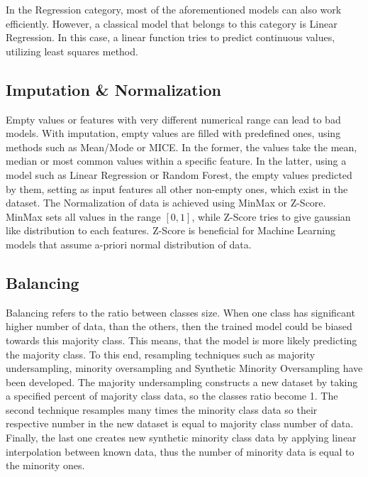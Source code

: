 \documentclass[journal,article,submit,pdftex,moreauthors]{Definitions/mdpi}
\begin{document}
In the Regression category, most of the aforementioned models can also work efficiently. However, a classical model that belongs
to this category is Linear Regression. In this case, a linear function tries to predict continuous values, utilizing least squares 
method.
\subsection{Imputation \& Normalization}
Empty values or features with very different numerical range can lead to bad models. With imputation, empty values are filled with 
predefined ones, using methods such as Mean/Mode or MICE. In the former, the values take the mean, median or most common values 
within a specific feature. In the latter, using a model such as Linear Regression or Random Forest, the empty values predicted 
by  them, setting as input features all other non-empty ones, which exist in the dataset. The Normalization of data is achieved
using MinMax or Z-Score. MinMax sets all values in the range $[0,1]$, while Z-Score tries to give gaussian like distribution 
to each features. Z-Score is beneficial for Machine Learning models that assume a-priori normal distribution of data.
\subsection{Balancing}
Balancing refers to the ratio between classes size. When one class has significant higher number of data, than the others, then
the trained model could be biased towards this majority class. This means, that the model is more likely predicting the majority
class. To this end, resampling techniques such as majority undersampling, minority oversampling and Synthetic Minority Oversampling
have been developed. The majority undersampling constructs a new dataset by taking a specified percent of majority class data, so
the classes ratio become 1. The second technique resamples many times the minority class data so their respective number 
in the new dataset is equal to majority class number of data. Finally, the last one creates new synthetic minority class data 
by applying linear interpolation between known data, thus the number of minority data is equal to the minority ones. 
\end{document}
